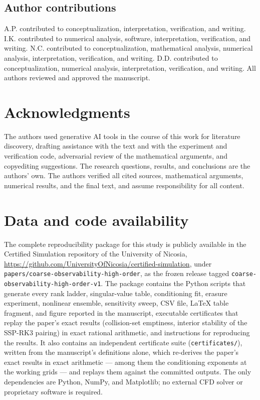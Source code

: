 \documentclass[pdflatex,sn-mathphys-num]{sn-jnl}%
\theoremstyle{thmstyleone}%
\theoremstyle{thmstyletwo}%
\theoremstyle{thmstylethree}%
\begin{document}
\subsection*{Author contributions}
A.P. contributed to conceptualization, interpretation, verification, and writing.
I.K. contributed to numerical analysis, software, interpretation, verification, and writing.
N.C. contributed to conceptualization, mathematical analysis, numerical analysis, interpretation, verification, and writing.
D.D. contributed to conceptualization, numerical analysis, interpretation, verification, and writing.
All authors reviewed and approved the manuscript.

\section*{Acknowledgments}

The authors used generative AI tools in the course of this work for literature discovery, drafting assistance with the text and with the experiment and verification code, adversarial review of the mathematical arguments, and copyediting suggestions.
The research questions, results, and conclusions are the authors' own.
The authors verified all cited sources, mathematical arguments, numerical results, and the final text, and assume responsibility for all content.

\section*{Data and code availability}

The complete reproducibility package for this study is publicly available in the Certified Simulation repository of the University of Nicosia, \url{https://github.com/UniversityOfNicosia/certified-simulation}, under \texttt{papers/coarse-observability-high-order}, as the frozen release tagged \texttt{coarse-observability-high-order-v1}.
The package contains the Python scripts that generate every rank ladder, singular-value table, conditioning fit, erasure experiment, nonlinear ensemble, sensitivity sweep, CSV file, LaTeX table fragment, and figure reported in the manuscript, executable certificates that replay the paper's exact results (collision-set emptiness, interior stability of the SSP-RK3 pairing) in exact rational arithmetic, and instructions for reproducing the results.
It also contains an independent certificate suite (\texttt{certificates/}), written from the manuscript's definitions alone, which re-derives the paper's exact results in exact arithmetic --- among them the conditioning exponents at the working grids --- and replays them against the committed outputs.
The only dependencies are Python, NumPy, and Matplotlib; no external CFD solver or proprietary software is required.
\end{document}

